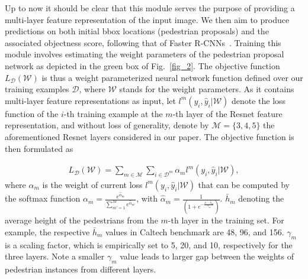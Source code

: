 \documentclass[10pt,journal,compsoc,twoside]{IEEEtran}
\begin{document}
Up to now it should be clear that this module serves the purpose of providing a multi-layer feature representation of the input image.
We then aim to produce predictions on both initial bbox locations (pedestrian proposals) and the associated objectness score, following that of Faster R-CNNs~\cite{RenEtAl:nips15}.
Training this module involves estimating the weight parameters of the pedestrian proposal network as depicted in the green box of Fig.~\ref{fig_2}.
The objective function $L_{\mathcal{D}} \left(\mathcal{W} \right)$ is thus a weight parameterized neural network function defined over our training examples $\mathcal{D}$,
where $\mathcal{W}$ stands for the weight parameters.
As it contains multi-layer feature representations as input, let $l^m \left( y_i, \hat{y}_i | \mathcal{W} \right)$ denote the loss function of the $i$-th training example at the $m$-th layer of the Resnet feature representation, and without loss of generality, denote by $\mathcal{M}=\{3,4,5\}$ the aforementioned Resnet layers considered in our paper. The objective function is then formulated as
%

\begin{align}
\label{eq1}
L_{\mathcal{D}}(\mathcal{W})=\sum\limits_{m \in \mathcal{M}} \sum\limits_{i\in{\mathcal{D}^m}} \alpha_m l^m( y_i, \hat{y}_i|\mathcal{W}),
\end{align}
where
$\alpha_m$ is the weight of current loss $l^m( y_i, \hat{y}_i|\mathcal{W})$ that can be computed by the softmax function $\alpha_m = \frac{e^{\hat{\alpha}_m}} {\sum\limits_{m'=1}^M e^{\hat{\alpha}_{m'}}}$, with $\hat{\alpha}_m = \frac{1} {(1+e^{- \frac{h-\bar{h}_m}{\gamma_m} })}$.
$\bar{h}_m$ denoting the average height of the pedestrians from the $m$-th layer in the training set.
For example, the respective $\bar{h}_m$ values in Caltech benchmark are 48, 96, and 156.
${\gamma}_m$ is a scaling factor, which is empirically set to 5, 20, and 10, respectively for the three layers.
Note a smaller ${\gamma}_m$ value leads to larger gap between the weights of pedestrian instances from different layers.
\end{document}
